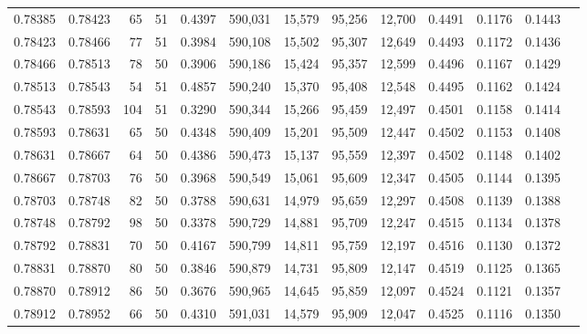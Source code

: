 \begin{tabular}{rrrrrrrrrrrrr}
0.78385 & 0.78423 &    65 &  51 &                                     0.4397 & 590,031 &  15,579 &  95,256 &  12,700 & 0.4491 & 0.1176 & 0.1443 \\
0.78423 & 0.78466 &    77 &  51 &                                     0.3984 & 590,108 &  15,502 &  95,307 &  12,649 & 0.4493 & 0.1172 & 0.1436 \\
0.78466 & 0.78513 &    78 &  50 &                                     0.3906 & 590,186 &  15,424 &  95,357 &  12,599 & 0.4496 & 0.1167 & 0.1429 \\
0.78513 & 0.78543 &    54 &  51 &                                     0.4857 & 590,240 &  15,370 &  95,408 &  12,548 & 0.4495 & 0.1162 & 0.1424 \\
0.78543 & 0.78593 &   104 &  51 &                                     0.3290 & 590,344 &  15,266 &  95,459 &  12,497 & 0.4501 & 0.1158 & 0.1414 \\
0.78593 & 0.78631 &    65 &  50 &                                     0.4348 & 590,409 &  15,201 &  95,509 &  12,447 & 0.4502 & 0.1153 & 0.1408 \\
0.78631 & 0.78667 &    64 &  50 &                                     0.4386 & 590,473 &  15,137 &  95,559 &  12,397 & 0.4502 & 0.1148 & 0.1402 \\
0.78667 & 0.78703 &    76 &  50 &                                     0.3968 & 590,549 &  15,061 &  95,609 &  12,347 & 0.4505 & 0.1144 & 0.1395 \\
0.78703 & 0.78748 &    82 &  50 &                                     0.3788 & 590,631 &  14,979 &  95,659 &  12,297 & 0.4508 & 0.1139 & 0.1388 \\
0.78748 & 0.78792 &    98 &  50 &                                     0.3378 & 590,729 &  14,881 &  95,709 &  12,247 & 0.4515 & 0.1134 & 0.1378 \\
0.78792 & 0.78831 &    70 &  50 &                                     0.4167 & 590,799 &  14,811 &  95,759 &  12,197 & 0.4516 & 0.1130 & 0.1372 \\
0.78831 & 0.78870 &    80 &  50 &                                     0.3846 & 590,879 &  14,731 &  95,809 &  12,147 & 0.4519 & 0.1125 & 0.1365 \\
0.78870 & 0.78912 &    86 &  50 &                                     0.3676 & 590,965 &  14,645 &  95,859 &  12,097 & 0.4524 & 0.1121 & 0.1357 \\
0.78912 & 0.78952 &    66 &  50 &                                     0.4310 & 591,031 &  14,579 &  95,909 &  12,047 & 0.4525 & 0.1116 & 0.1350 \\

\end{tabular}
